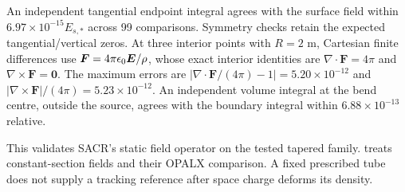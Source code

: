 An independent tangential endpoint integral agrees with the surface field
within $6.97\times10^{-15}E_{s,*}$ across 99 comparisons. Symmetry checks retain
the expected tangential/vertical zeros. At three interior points with $R=2$ m,
Cartesian finite differences use $\bm F=4\pi\epsilon_0\bm E/\rho$, whose exact
interior identities are $\nabla\cdot\bm F=4\pi$ and
$\nabla\times\bm F=\bm0$. The maximum errors are
$|\nabla\cdot\bm F/(4\pi)-1|=5.20\times10^{-12}$ and
$|\nabla\times\bm F|/(4\pi)=5.23\times10^{-12}$.
An independent volume integral at the bend centre, outside the source, agrees
with the boundary integral within $6.88\times10^{-13}$ relative.

This validates SACR's static field operator on the tested tapered family.
 treats constant-section fields and their OPALX comparison.
A fixed prescribed tube does not supply a tracking reference after space
charge deforms its density.
